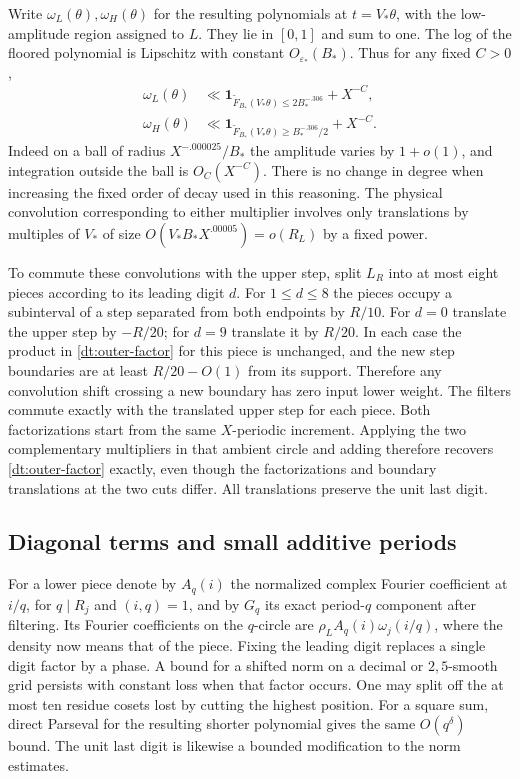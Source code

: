 \documentclass[11pt,a4paper]{article}
\theoremstyle{paperplain}
\numberwithin{equation}{section}
\newcommand{\ind}{\mathbf1}
\begin{document}
Write \(\omega_L(\theta),\omega_H(\theta)\) for the resulting
polynomials at \(t=V_*\theta\), with the low-amplitude region assigned
to \(L\). They lie in \([0,1]\) and sum to one. The log of the
floored polynomial is Lipschitz with constant \(O_{\varepsilon_*}(B_*)\).
Thus for any fixed \(C>0\),
\begin{align}
 \omega_L(\theta)&\ll
  \ind_{\widetilde F_{B_*}(V_*\theta)\le2 B_*^{-.306}}+X^{-C},\label{dt:low-filter}\\
 \omega_H(\theta)&\ll
  \ind_{\widetilde F_{B_*}(V_*\theta)\ge B_*^{-.306}/2}+X^{-C}.
 \label{dt:high-filter}
\end{align}
Indeed on a ball of radius \(X^{-.000025}/B_*\) the amplitude varies
by \(1+o(1)\), and integration outside the ball is \(O_C(X^{-C})\).
There is no change in degree when increasing the fixed order of
decay used in this reasoning. The physical convolution corresponding
to either multiplier involves only translations by multiples of \(V_*\)
of size \(O(V_*B_*X^{.00005})=o(R_L)\) by a fixed power.

To commute these convolutions with the upper step, split \(L_R\) into
at most eight pieces according to its leading digit \(d\).
For \(1\le d\le8\) the pieces occupy a subinterval of a step
separated from both endpoints by \(R/10\). For \(d=0\) translate
the upper step by \(-R/20\); for \(d=9\) translate it by \(R/20\).
In each case the product in \eqref{dt:outer-factor} for this piece is
unchanged, and the new step boundaries are at least \(R/20-O(1)\)
from its support. Therefore any convolution shift crossing a new
boundary has zero input lower weight. The filters commute exactly
with the translated upper step for each piece. Both factorizations
start from the same \(X\)-periodic increment. Applying the two
complementary multipliers in that ambient circle and adding therefore
recovers \eqref{dt:outer-factor} exactly, even though the factorizations
and boundary translations at the two cuts differ. All translations
preserve the unit last digit.

\subsection{Diagonal terms and small additive periods}\label{dt:diagonal}

For a lower piece denote by \(A_q(i)\) the normalized complex Fourier
coefficient at \(i/q\), for \(q\mid R_j\) and \((i,q)=1\), and by
\(G_q\) its exact period-\(q\) component after filtering. Its Fourier
coefficients on the \(q\)-circle are \(\rho_L A_q(i)\omega_j(i/q)\),
where the density now means that of the piece. Fixing the leading
digit replaces a single digit factor by a phase. A bound for a
shifted norm on a decimal or \(2,5\)-smooth grid persists with
constant loss when that factor occurs. One may split off the
at most ten residue cosets lost by cutting the highest position.
For a square sum, direct Parseval for the resulting shorter
polynomial gives the same \(O(q^\delta)\) bound. The unit last
digit is likewise a bounded modification to the norm estimates.
\end{document}
